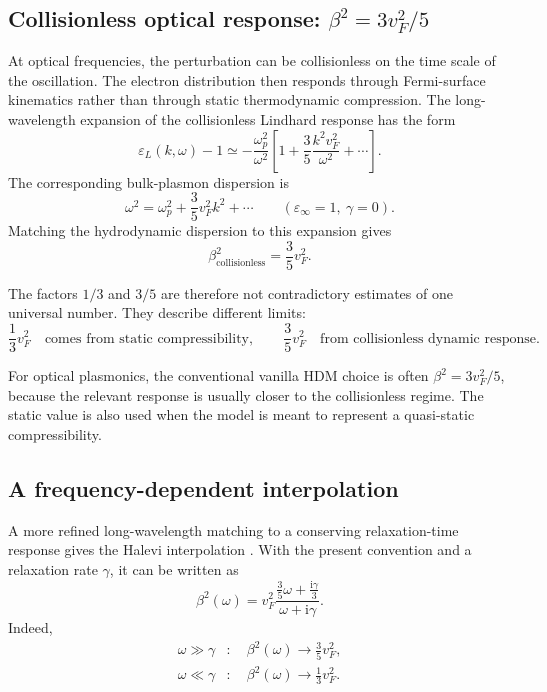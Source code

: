 \documentclass[11pt,a4paper]{article}
\newcommand{\ii}{\mathrm i}
\newcommand{\eps}{\varepsilon}
\newcommand{\epsinf}{\varepsilon_\infty}
\newcommand{\omegap}{\omega_p}
\newcommand{\vF}{v_F}
\begin{document}
\subsection{Collisionless optical response: \texorpdfstring{$\beta^2=3\vF^2/5$}{beta2=3vF2/5}}

At optical frequencies, the perturbation can be collisionless on the time
scale of the oscillation.  The electron distribution then responds through
Fermi-surface kinematics rather than through static thermodynamic compression.
The long-wavelength expansion of the collisionless Lindhard response has the
form
\begin{equation}
    \eps_L(k,\omega)-1
    \simeq
    -\frac{\omegap^2}{\omega^2}
    \left[1+\frac{3}{5}\frac{k^2\vF^2}{\omega^2}+\cdots\right].
    \label{eq:lindhard-expansion}
\end{equation}
The corresponding bulk-plasmon dispersion is
\begin{equation}
    \omega^2
    =\omegap^2+\frac{3}{5}\vF^2 k^2+\cdots
    \qquad (\epsinf=1,\ \gamma=0).
    \label{eq:collisionless-dispersion}
\end{equation}
Matching the hydrodynamic dispersion to this expansion gives
\begin{equation}
    \boxed{\beta_{\mathrm{collisionless}}^2=\frac{3}{5}\vF^2.}
    \label{eq:beta-collisionless}
\end{equation}

The factors \(1/3\) and \(3/5\) are therefore not contradictory estimates of
one universal number.  They describe different limits:
\begin{equation}
    \frac{1}{3}\vF^2
    \quad\text{comes from static compressibility},
    \qquad
    \frac{3}{5}\vF^2
    \quad\text{from collisionless dynamic response}.
    \label{eq:beta-two-limits}
\end{equation}

For optical plasmonics, the conventional vanilla HDM choice is often
\(\beta^2=3\vF^2/5\), because the relevant response is usually closer to the
collisionless regime.  The static value is also used when the model is meant
to represent a quasi-static compressibility.

\subsection{A frequency-dependent interpolation}

A more refined long-wavelength matching to a conserving relaxation-time
response gives the Halevi interpolation \cite{Halevi1995,Mermin1970}.  With
the present convention and a relaxation rate \(\gamma\), it can be written
as
\begin{equation}
    \boxed{
    \beta^2(\omega)
    =\vF^2
      \frac{\frac{3}{5}\omega+\frac{\ii\gamma}{3}}
           {\omega+\ii\gamma}.
    }
    \label{eq:halevi-beta}
\end{equation}
Indeed,
\begin{align}
    \omega\gg\gamma&:\quad
    \beta^2(\omega)\longrightarrow\frac{3}{5}\vF^2,\\
    \omega\ll\gamma&:\quad
    \beta^2(\omega)\longrightarrow\frac{1}{3}\vF^2.
    \label{eq:halevi-limits}
\end{align}
\end{document}

